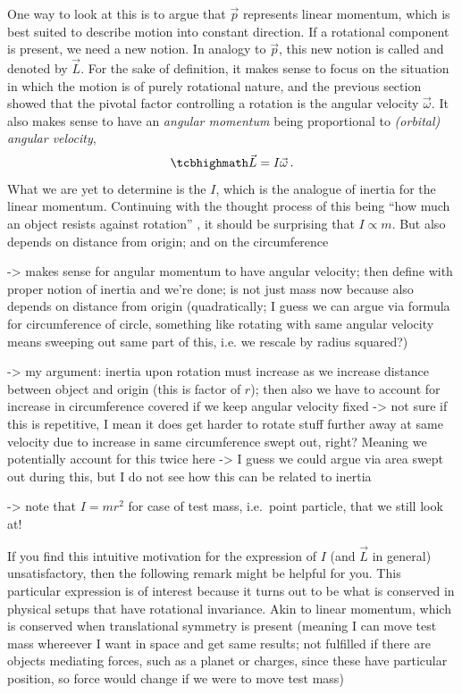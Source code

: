 \documentclass[../class_mech_main.tex]{subfiles}
\begin{document}
One way to look at this is to argue that $\vec{p}$ represents linear momentum, which is best suited to describe motion into constant direction. If a rotational component is present, we need a new notion. In analogy to $\vec{p}$, this new notion is called  and denoted by $\vec{L}$. For the sake of definition, it makes sense to focus on the situation in which the motion is of purely rotational nature, and the previous section showed that the pivotal factor controlling a rotation is the angular velocity $\vec{\omega}$. It also makes sense to have an \emph{angular momentum} being proportional to \emph{(orbital) angular velocity},
\begin{equation}
	\eqbox{\vec{L} = I \vec{\omega}} \, .
\end{equation}
What we are yet to determine is the  $I$, which is the analogue of inertia for the linear momentum. Continuing with the thought process of this being \enquote{how much an object resists against rotation} , it should be surprising that $I \propto m$.
But also depends on distance from origin; and on the circumference

-> makes sense for angular momentum to have angular velocity; then define with proper notion of inertia and we're done; is not just mass now because also depends on distance from origin (quadratically; I guess we can argue via formula for circumference of circle, something like rotating with same angular velocity means sweeping out same part of this, i.e. we rescale by radius squared?)

-> my argument: inertia upon rotation must increase as we increase distance between object and origin (this is factor of $r$); then also we have to account for increase in circumference covered if we keep angular velocity fixed -> not sure if this is repetitive, I mean it does get harder to rotate stuff further away at same velocity due to increase in same circumference swept out, right? Meaning we potentially account for this twice here -> I guess we could argue via area swept out during this, but I do not see how this can be related to inertia

-> note that $I = m r^2$ for case of test mass, i.e.~point particle, that we still look at!


If you find this intuitive motivation for the expression of $I$ (and $\vec{L}$ in general) unsatisfactory, then the following remark might be helpful for you. This particular expression is of interest because it turns out to be what is conserved in physical setups that have rotational invariance. Akin to linear momentum, which is conserved when translational symmetry is present (meaning I can move test mass whereever I want in space and get same results; not fulfilled if there are objects mediating forces, such as a planet or charges, since these have particular position, so force would change if we were to move test mass)
\end{document}
